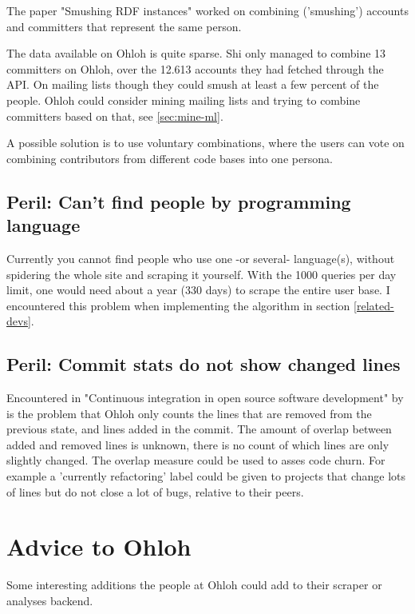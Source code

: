 \documentclass{sig-alternate}
\begin{document}
The paper "Smushing RDF instances" \cite{Shi:2008p4464} worked on combining ('smushing') accounts and committers that represent the same person.

The data available on Ohloh is quite sparse. Shi only managed to combine 13 committers on Ohloh, over the 12.613 accounts they had fetched through the API. On mailing lists though they could smush at least a few percent of the people. Ohloh could consider mining mailing lists and trying to combine committers based on that, see \ref{sec:mine-ml}.

A possible solution is to use voluntary combinations, where the users can vote on combining contributors from different code bases into one persona. 


\subsection{Peril: Can't find people by programming language}

Currently you cannot find people who use one -or several- language(s), without spidering the whole site and scraping it yourself. With the 1000 queries per day limit, one would need about a year (330 days) to scrape the entire user base. I encountered this problem when implementing the algorithm in section \ref{related-devs}.


\subsection{Peril: Commit stats do not show changed lines}

Encountered in "Continuous integration in open source software development" by \cite{Deshpande:2008p4463} is the problem that Ohloh only counts the lines that are removed from the previous state, and lines added in the commit. The amount of overlap between added and removed lines is unknown, there is no count of which lines are only slightly changed. The overlap measure could be used to asses code churn. For example a 'currently refactoring' label could be given to projects that change lots of lines but do not close a lot of bugs, relative to their peers.



\section{Advice to Ohloh}
Some interesting additions the people at Ohloh could add to their scraper or analyses backend.
\end{document}
